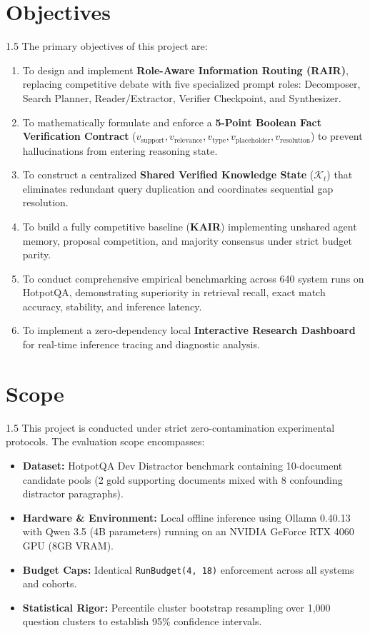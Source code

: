\documentclass[12pt,a4paper]{report}
\begin{document}
\section{Objectives}
\begin{spacing}{1.5}
The primary objectives of this project are:
\begin{enumerate}
    \item To design and implement \textbf{Role-Aware Information Routing (RAIR)}, replacing competitive debate with five specialized prompt roles: Decomposer, Search Planner, Reader/Extractor, Verifier Checkpoint, and Synthesizer.
    \item To mathematically formulate and enforce a \textbf{5-Point Boolean Fact Verification Contract} ($v_{\text{support}}, v_{\text{relevance}}, v_{\text{type}}, v_{\text{placeholder}}, v_{\text{resolution}}$) to prevent hallucinations from entering reasoning state.
    \item To construct a centralized \textbf{Shared Verified Knowledge State} ($\mathcal{K}_t$) that eliminates redundant query duplication and coordinates sequential gap resolution.
    \item To build a fully competitive baseline (\textbf{KAIR}) implementing unshared agent memory, proposal competition, and majority consensus under strict budget parity.
    \item To conduct comprehensive empirical benchmarking across 640 system runs on HotpotQA, demonstrating superiority in retrieval recall, exact match accuracy, stability, and inference latency.
    \item To implement a zero-dependency local \textbf{Interactive Research Dashboard} for real-time inference tracing and diagnostic analysis.
\end{enumerate}
\end{spacing}

\section{Scope}
\begin{spacing}{1.5}
This project is conducted under strict zero-contamination experimental protocols. The evaluation scope encompasses:
\begin{itemize}
    \item \textbf{Dataset:} HotpotQA Dev Distractor benchmark containing 10-document candidate pools (2 gold supporting documents mixed with 8 confounding distractor paragraphs).
    \item \textbf{Hardware \& Environment:} Local offline inference using Ollama 0.40.13 with Qwen 3.5 (4B parameters) running on an NVIDIA GeForce RTX 4060 GPU (8GB VRAM).
    \item \textbf{Budget Caps:} Identical \texttt{RunBudget(4, 18)} enforcement across all systems and cohorts.
    \item \textbf{Statistical Rigor:} Percentile cluster bootstrap resampling over 1,000 question clusters to establish 95\% confidence intervals.
\end{itemize}
\end{spacing}
\end{document}
